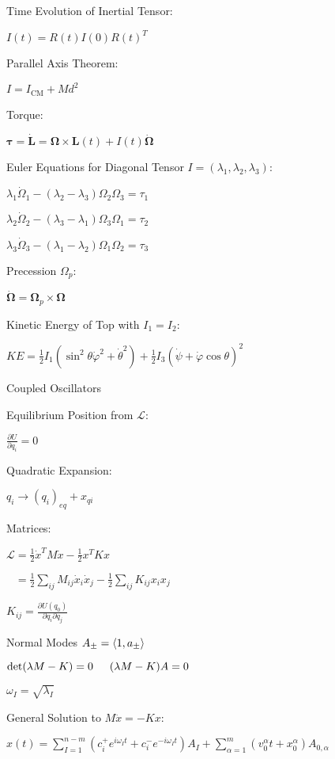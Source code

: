 \documentclass[10pt]{article}
\makeatletter
\newcommand{\ds}{\displaystyle}
\newcommand{\tab}{\hspace{.02\textwidth}}
\newcommand{\twoEqn}[4]{$\makebox[#3][l]{$\ds #1$} \makebox[#4][l]{$\ds #2$}$}
\newcommand{\p}{\partial}
\newcommand{\pd}[2]{\frac{\partial #1}{\partial #2}}
\newcommand{\agb}[1]{\left\langle#1\right\rangle}
\let\originalleft\left
\let\originalright\right
\renewcommand{\left}{\mathopen{}\mathclose\bgroup\originalleft}
\renewcommand{\right}{\aftergroup\egroup\originalright}
\renewcommand{\section}{\@startsection{section}{1}{0ex}
                                {-2ex}
                                {0.7ex}
                                {\normalfont\large\bfseries}}
\renewcommand{\L}{\mathcal{L}}
\renewcommand{\phi}{\varphi}
\newcommand{\CM}{\text{CM}}
\newcommand{\bv}[1]{\boldsymbol{#1}}
\newcommand{\tp}{^T} %
\makeatother
\begin{document}
\begin{multicols*}{3}
Time Evolution of Inertial Tensor:

\tab $I(t)=R(t)I(0)R(t)\tp$

Parallel Axis Theorem:

\tab $I=I_{\CM}+Md^2$

Torque:

\tab $\bv\tau=\dot{\bv L}=\bv\Omega\times\bv L(t)+I(t)\dot{\bv\Omega}$

Euler Equations for Diagonal Tensor $I=(\lambda_1,\lambda_2,\lambda_3)$:

\tab $\lambda_1\dot\Omega_1-(\lambda_2-\lambda_3)\Omega_2\Omega_3=\tau_1$

\tab $\lambda_2\dot\Omega_2-(\lambda_3-\lambda_1)\Omega_3\Omega_1=\tau_2$

\tab $\lambda_3\dot\Omega_3-(\lambda_1-\lambda_2)\Omega_1\Omega_2=\tau_3$

Precession $\Omega_p$:

\tab $\dot{\bv\Omega}=\bv\Omega_p\times\bv\Omega$

Kinetic Energy of Top with $I_1=I_2$:

\tab $KE=\frac 12I_1(\sin^2\theta\dot\phi^2+\dot\theta^2)+\frac 12I_3(\dot\psi+\dot\phi\cos\theta)^2$

\section{Coupled Oscillators}

Equilibrium Position from $\L$:

\tab $\pd{U}{q_i}=0$

Quadratic Expansion:

\tab $q_i\to(q_i)_{eq}+x_{qi}$

Matrices:

\tab $\L=\frac 12\dot x\tp M\dot x-\frac 12x\tp Kx$

\tab $\phantom{\L}=\frac 12\sum_{ij}M_{ij}\dot x_i\dot x_j-\frac 12\sum_{ij}K_{ij}x_ix_j$

\tab $K_{ij}=\frac{\p U(q_0)}{\p q_i\p q_j}$

Normal Modes $A_\pm=\agb{1,a_{\pm}}$

\tab \twoEqn{\det(\lambda M-K)=0}{(\lambda M-K)A=0}{9.3em}{9em}

\tab $\omega_I=\sqrt{\lambda_I}$

General Solution to $M\ddot x=-Kx$:

\tab $x(t)=\sum_{I=1}^{n-m}(c_i^+e^{i\omega_I t}+c_i^-e^{-i\omega_I t})A_I+\sum_{\alpha=1}^m(v_0^\alpha t+x_0^\alpha)A_{0,\alpha}$


\end{multicols*}
\end{document}
